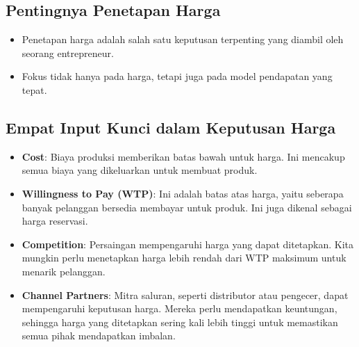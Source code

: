 \documentclass{article}
\begin{document}
\subsection{Pentingnya Penetapan Harga}
\begin{itemize}
    \item Penetapan harga adalah salah satu keputusan terpenting yang diambil oleh seorang entrepreneur.
    \item Fokus tidak hanya pada harga, tetapi juga pada model pendapatan yang tepat.
\end{itemize}

\subsection{Empat Input Kunci dalam Keputusan Harga}
\begin{itemize}
    \item \textbf{Cost}: Biaya produksi memberikan batas bawah untuk harga. Ini mencakup semua biaya yang dikeluarkan untuk membuat produk.
    \item \textbf{Willingness to Pay (WTP)}: Ini adalah batas atas harga, yaitu seberapa banyak pelanggan bersedia membayar untuk produk. Ini juga dikenal sebagai harga reservasi.
    \item \textbf{Competition}: Persaingan mempengaruhi harga yang dapat ditetapkan. Kita mungkin perlu menetapkan harga lebih rendah dari WTP maksimum untuk menarik pelanggan.
    \item \textbf{Channel Partners}: Mitra saluran, seperti distributor atau pengecer, dapat mempengaruhi keputusan harga. Mereka perlu mendapatkan keuntungan, sehingga harga yang ditetapkan sering kali lebih tinggi untuk memastikan semua pihak mendapatkan imbalan.
\end{itemize}
\end{document}

